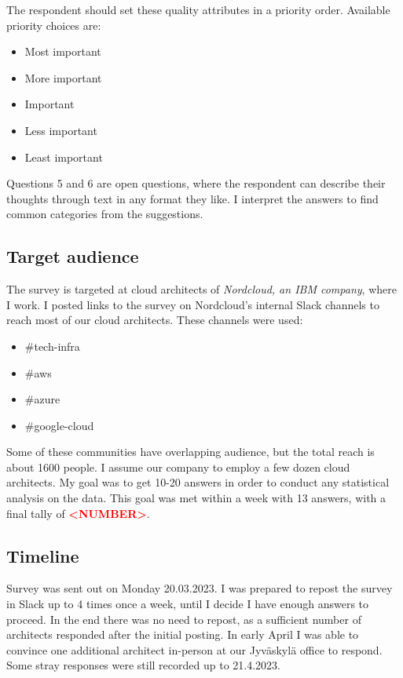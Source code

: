 \documentclass[utf8,english]{gradu3}
\newcommand{\todo}[1]{\textbf{\textcolor{red}{#1}}}
\begin{document}
The respondent should set these quality attributes in a priority order.
Available priority choices are:
\begin{itemize}
  \item Most important
  \item More important
  \item Important
  \item Less important
  \item Least important
\end{itemize}

Questions 5 and 6 are open questions, where the respondent can describe their thoughts through text in any format they like.
I interpret the answers to find common categories from the suggestions.

\subsection{Target audience}
The survey is targeted at cloud architects of \emph{Nordcloud, an IBM company}, where I work.
I posted links to the survey on Nordcloud's internal Slack channels to reach
most of our cloud architects.
These channels were used:
\begin{itemize}
  \item \#tech-infra
  \item \#aws
  \item \#azure
  \item \#google-cloud
\end{itemize}

Some of these communities have overlapping audience, but the total reach is about 1600 people.
I assume our company to employ a few dozen cloud architects.
My goal was to get 10-20 answers in order to conduct any statistical analysis on
the data.
This goal was met within a week with 13 answers, with a final tally of \todo{<NUMBER>}.

\subsection{Timeline}
Survey was sent out on Monday 20.03.2023.
I was prepared to repost the survey in Slack up to 4 times once a week, until I
decide I have enough answers to proceed.
In the end there was no need to repost, as a sufficient number of architects
responded after the initial posting.
In early April I was able to convince one additional architect in-person at our
Jyväskylä office to respond.
Some stray responses were still recorded up to 21.4.2023.
\end{document}
